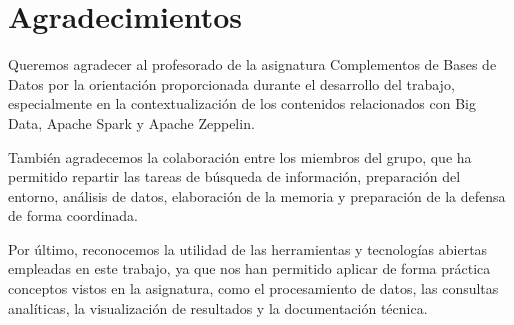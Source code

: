 \chapter*{Agradecimientos}
Queremos agradecer al profesorado de la asignatura Complementos de Bases de Datos
por la orientación proporcionada durante el desarrollo del trabajo, especialmente en
la contextualización de los contenidos relacionados con Big Data, Apache Spark y
Apache Zeppelin.

También agradecemos la colaboración entre los miembros del grupo, que ha permitido
repartir las tareas de búsqueda de información, preparación del entorno, análisis de
datos, elaboración de la memoria y preparación de la defensa de forma coordinada.

Por último, reconocemos la utilidad de las herramientas y tecnologías abiertas
empleadas en este trabajo, ya que nos han permitido aplicar de forma práctica
conceptos vistos en la asignatura, como el procesamiento de datos, las consultas
analíticas, la visualización de resultados y la documentación técnica.